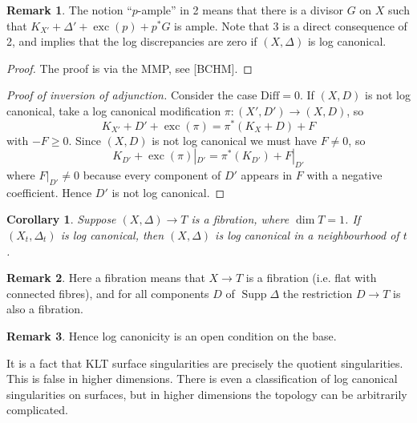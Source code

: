 \documentclass{article}
\newtheorem*{corollary}{Corollary}
\theoremstyle{definition}
\newtheorem*{remark}{Remark}
\DeclareMathOperator{\Supp}{Supp}
\DeclareMathOperator{\exc}{exc}
\newcommand{\Diff}{\mathrm{Diff}}
\begin{document}
\begin{remark}
    The notion ``$p$-ample'' in 2 means that there is a divisor $G$ on $X$ such
    that $K_{X'}+\Delta'+\exc(p)+p^*G$ is ample. Note that 3 is a direct
    consequence of 2, and implies that the log discrepancies are zero if
    $(X,\Delta)$ is log canonical.
\end{remark}

\begin{proof}
    The proof is via the MMP, see [BCHM].
\end{proof}

\begin{proof}[Proof of inversion of adjunction]
    Consider the case $\Diff=0$. If $(X,D)$ is not log canonical, take a
    log canonical modification $\pi:(X',D')\to(X,D)$, so
    \begin{equation*}
        K_{X'} + D' + \exc(\pi) = \pi^*(K_X+D) + F
    \end{equation*}
    with $-F\ge0$. Since $(X,D)$ is not log canonical we must have $F\ne0$, so
    \begin{equation*}
        K_{D'} + \exc(\pi)|_{D'} = \pi^*(K_{D'}) + F|_{D'}
    \end{equation*}
    where $F|_{D'}\ne0$ because every component of $D'$ appears in $F$ with a
    negative coefficient. Hence $D'$ is not log canonical.
\end{proof}

\begin{corollary}
    Suppose $(X,\Delta)\to T$ is a fibration, where $\dim T=1$. If
    $(X_t,\Delta_t)$ is log canonical, then $(X,\Delta)$ is log canonical in a
    neighbourhood of $t$.
\end{corollary}

\begin{remark}
    Here a fibration means that $X\to T$ is a fibration (i.e. flat with
    connected fibres), and for all components $D$ of $\Supp\Delta$ the
    restriction $D\to T$ is also a fibration.
\end{remark}

\begin{remark}
    Hence log canonicity is an open condition on the base.
\end{remark}

It is a fact that KLT surface singularities are precisely the quotient
singularities. This is false in higher dimensions. There is even a
classification of log canonical singularities on surfaces, but in higher
dimensions the topology can be arbitrarily complicated.
\end{document}
